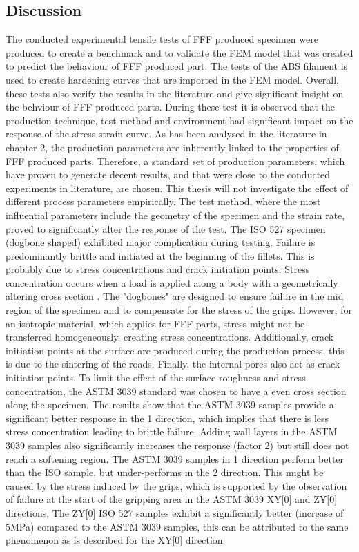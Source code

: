 \subsection{Discussion}
The conducted experimental tensile tests of FFF produced specimen were produced to create a benchmark and to validate the FEM model that was created to predict the behaviour of FFF produced part. The tests of the ABS filament is used to create hardening curves that are imported in the FEM model. Overall, these tests also verify the results in the literature and give significant insight on the behviour of FFF produced parts. 
During these test it is observed that the production technique, test method and environment had significant impact on the response of the stress strain curve. As has been analysed in the literature in chapter 2, the production parameters are inherently linked to the properties of FFF produced parts. Therefore, a standard set of production parameters, which have proven to generate decent results, and that were close to the conducted experiments in literature, are chosen. This thesis will not investigate the effect of different process parameters empirically. The test method, where the most influential  parameters include the geometry of the specimen and the strain rate, proved to significantly alter the response of the test. The ISO 527 specimen (dogbone shaped) exhibited major complication during testing. Failure is predominantly brittle and initiated at the beginning of the fillets. This is probably due to stress concentrations and crack initiation points. 
Stress concentration occurs when a load is applied along a body with a geometrically altering cross section \cite{TronvollTheApproach}. The "dogbones" are designed to ensure failure in the mid region of the specimen and to compensate for the stress of the grips. However, for an isotropic material, which applies for FFF parts, stress might not be transferred homogeneously, creating stress concentrations. Additionally, crack initiation points at the surface are produced during the production process, this is due to the sintering of the roads. Finally, the internal pores also act as crack initiation points. To limit the effect of the surface roughness and stress concentration, the ASTM 3039 standard was chosen to have a even cross section along the specimen. The results show that the ASTM 3039 samples provide a significant better response in the 1 direction, which implies that there is less stress concentration leading to brittle failure. Adding wall layers in the ASTM 3039 samples also significantly increases the response (factor 2) but still does not reach a softening region. The ASTM 3039 samples in 1 direction perform better than the ISO sample, but under-performs in the 2 direction. This might be caused by the stress induced by the grips, which is supported by the observation of failure at the start of the gripping area in the ASTM 3039  XY[0] and ZY[0] directions. The ZY[0] ISO 527 samples exhibit a significantly better (increase of 5MPa) compared to the ASTM 3039 samples, this can be attributed to the same phenomenon as is described for the XY[0] direction.
